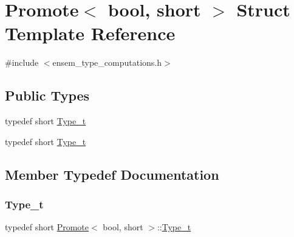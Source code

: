 \hypertarget{structPromote_3_01bool_00_01short_01_4}{}\section{Promote$<$ bool, short $>$ Struct Template Reference}
\label{structPromote_3_01bool_00_01short_01_4}


{\ttfamily \#include $<$ensem\+\_\+type\+\_\+computations.\+h$>$}

\subsection*{Public Types}
\begin{DoxyCompactItemize}
\item 
typedef short \mbox{\hyperlink{structPromote_3_01bool_00_01short_01_4_aca2abaabb10b6748b41ca6064716e6b4}{Type\+\_\+t}}
\item 
typedef short \mbox{\hyperlink{structPromote_3_01bool_00_01short_01_4_aca2abaabb10b6748b41ca6064716e6b4}{Type\+\_\+t}}
\end{DoxyCompactItemize}


\subsection{Member Typedef Documentation}
\mbox{\label{structPromote_3_01bool_00_01short_01_4_aca2abaabb10b6748b41ca6064716e6b4}} 
\subsubsection{\texorpdfstring{Type\_t}{Type\_t}\hspace{0.1cm}{\footnotesize\ttfamily [1/2]}}
{\footnotesize\ttfamily typedef short \mbox{\hyperlink{structPromote}{Promote}}$<$ bool, short $>$\+::\mbox{\hyperlink{structPromote_3_01bool_00_01short_01_4_aca2abaabb10b6748b41ca6064716e6b4}{Type\+\_\+t}}}

\mbox{\label{structPromote_3_01bool_00_01short_01_4_aca2abaabb10b6748b41ca6064716e6b4}} 
